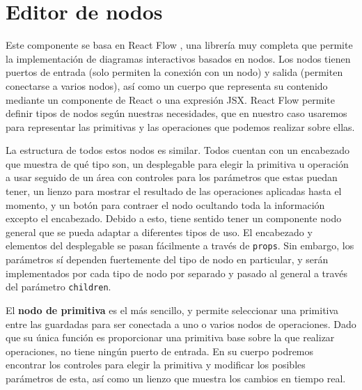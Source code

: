 \section{Editor de nodos}\label{sec:editorNodos}
Este componente se basa en React Flow \cite{react-flow}, una librería muy completa que permite la implementación de diagramas interactivos basados en nodos. Los nodos tienen puertos de entrada (solo permiten la conexión con un nodo) y salida (permiten conectarse a varios nodos), así como un cuerpo que representa su contenido mediante un componente de React o una expresión JSX. React Flow permite definir tipos de nodos según nuestras necesidades, que en nuestro caso usaremos para representar las primitivas y las operaciones que podemos realizar sobre ellas.\newline

La estructura de todos estos nodos es similar. Todos cuentan con un encabezado que muestra de qué tipo son, un desplegable para elegir la primitiva u operación a usar seguido de un área con controles para los parámetros que estas puedan tener, un lienzo para mostrar el resultado de las operaciones aplicadas hasta el momento, y un botón para contraer el nodo ocultando toda la información excepto el encabezado. Debido a esto, tiene sentido tener un componente nodo general que se pueda adaptar a diferentes tipos de uso. El encabezado y elementos del desplegable se pasan fácilmente a través de \texttt{props}. Sin embargo, los parámetros sí dependen fuertemente del tipo de nodo en particular, y serán implementados por cada tipo de nodo por separado y pasado al general a través del parámetro \texttt{children}.\newline

El \textbf{nodo de primitiva} es el más sencillo, y permite seleccionar una primitiva entre las guardadas para ser conectada a uno o varios nodos de operaciones. Dado que su única función es proporcionar una primitiva base sobre la que realizar operaciones, no tiene ningún puerto de entrada. En su cuerpo podremos encontrar los controles para elegir la primitiva y modificar los posibles parámetros de esta, así como un lienzo que muestra los cambios en tiempo real.\newline

